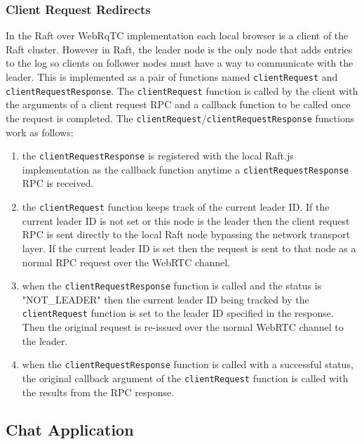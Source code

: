 \documentclass[9pt]{extarticle}
\begin{document}
\begin{multicols}{2}
\subsubsection{Client Request Redirects}


In the Raft over WebRqTC implementation each local browser is a client
of the Raft cluster. However in Raft, the leader node is the only node
that adds entries to the log so clients on follower nodes must have
a way to communicate with the leader. This is implemented as a pair of
functions named \texttt{clientRequest} and
\texttt{clientRequestResponse}. The \texttt{clientRequest} function is
called by the client with the arguments of a client request RPC and
a callback function to be called once the request is completed. The
\texttt{clientRequest}/\texttt{clientRequestResponse} functions work
as follows:

\begin{enumerate}
\item the \texttt{clientRequestResponse} is registered with the local
    Raft.js implementation as the callback function anytime
    a \texttt{clientRequestResponse} RPC is received.
\item the \texttt{clientRequest} function keeps track of the current
    leader ID.  If the current leader ID is not set or this node is
    the leader then the client request RPC is sent directly to the
    local Raft node bypassing the network transport layer.  If the
    current leader ID is set then the request is sent to that node as
    a normal RPC request over the WebRTC channel.
\item when the \texttt{clientRequestResponse} function is called and
    the status is "NOT\_LEADER" then the current leader ID being
    tracked by the \texttt{clientRequest} function is set to the
    leader ID specified in the response. Then the original request is
    re-issued over the normal WebRTC channel to the leader.
\item when the \texttt{clientRequestResponse} function is called with
    a successful status, the original callback argument of the
    \texttt{clientRequest} function is called with the results from
    the RPC response.
\end{enumerate}

\subsection{Chat Application}


\end{multicols}
\end{document}

